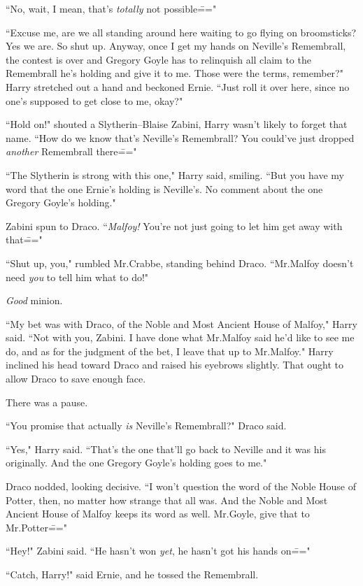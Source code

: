 ``No, wait, I mean, that's \emph{totally} not possible\==="

``Excuse me, are we all standing around here waiting to go flying on broomsticks? Yes we are. So shut up. Anyway, once I get my hands on Neville's Remembrall, the contest is over and Gregory Goyle has to relinquish all claim to the Remembrall he's holding and give it to me. Those were the terms, remember?" Harry stretched out a hand and beckoned Ernie. ``Just roll it over here, since no one's supposed to get close to me, okay?"

``Hold on!" shouted a Slytherin\---Blaise Zabini, Harry wasn't likely to forget that name. ``How do we know that's Neville's Remembrall? You could've just dropped \emph{another} Remembrall there\==="

``The Slytherin is strong with this one," Harry said, smiling. ``But you have my word that the one Ernie's holding is Neville's. No comment about the one Gregory Goyle's holding."

Zabini spun to Draco. ``\emph{Malfoy!} You're not just going to let him get away with that\==="

``Shut up, you," rumbled Mr.\?Crabbe, standing behind Draco. ``Mr.\?Malfoy doesn't need \emph{you} to tell him what to do!"

\emph{Good} minion.

``My bet was with Draco, of the Noble and Most Ancient House of Malfoy," Harry said. ``Not with you, Zabini. I have done what Mr.\?Malfoy said he'd like to see me do, and as for the judgment of the bet, I leave that up to Mr.\?Malfoy." Harry inclined his head toward Draco and raised his eyebrows slightly. That ought to allow Draco to save enough face.

There was a pause.

``You promise that actually \emph{is} Neville's Remembrall?" Draco said.

``Yes," Harry said. ``That's the one that'll go back to Neville and it was his originally. And the one Gregory Goyle's holding goes to me."

Draco nodded, looking decisive. ``I won't question the word of the Noble House of Potter, then, no matter how strange that all was. And the Noble and Most Ancient House of Malfoy keeps its word as well. Mr.\?Goyle, give that to Mr.\?Potter\==="

``Hey!" Zabini said. ``He hasn't won \emph{yet}, he hasn't got his hands on\==="

``Catch, Harry!" said Ernie, and he tossed the Remembrall.

